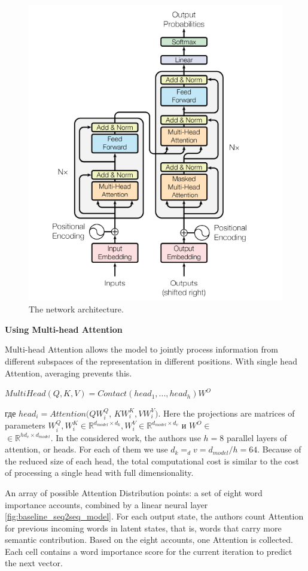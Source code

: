 \documentclass{article}
\begin{document}
\begin{figure}[!tbh]
    \centering
    \includegraphics[width=0.7\linewidth]{network.png}
    \caption{The network architecture.}
    \label{fig:network}
\end{figure}


\textbf{Using Multi-head Attention}

Multi-head Attention allows the model to jointly process information from different subspaces of the representation in different positions. With single head Attention, averaging prevents this. 
\begin{center}
    $ MultiHead(Q,K,V) = Contact({head}_1,..., {head}_h)W^{O}$
\end{center}
где ${head}_i = Attention(Q{W}^{Q}_{i}$, $K{W}^{K}_{i}, V{W}^{V}_{i})$.
Here the projections are matrices of parameters ${W}^{Q}_{i}, {W}^{K}_{i} \in \mathbb{R}^{d_{model} \times d_k}, {W}^{V}_{i} \in \mathbb{R}^{d_{model}\times d_v}$ и  $W^O \in$ \\$\in \mathbb{R}^{hd_v\times d_{model}}$.
In the considered work, the authors use $h = 8$ parallel layers of attention, or heads. For each of them we use $d_k = _dv = d_{model}/h = 64$. Because of the reduced size of each head, the total computational cost is similar to the cost of processing a single head with full dimensionality.

An array of possible Attention Distribution points: a set of eight word importance accounts, combined by a linear neural layer \ref{fig:baseline_seq2seq_model}. For each output state, the authors count Attention for previous incoming words in latent states, that is, words that carry more semantic contribution. Based on the eight accounts, one Attention is collected. Each cell contains a word importance score for the current iteration to predict the next vector.
\end{document}
